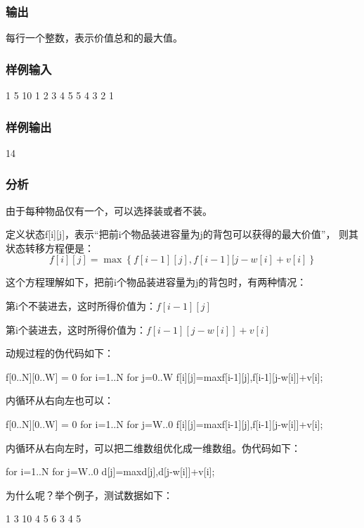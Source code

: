 \subsubsection{输出}
每行一个整数，表示价值总和的最大值。

\subsubsection{样例输入}
\begin{Code}
1
5 10
1 2 3 4 5
5 4 3 2 1
\end{Code}

\subsubsection{样例输出}
\begin{Code}
14
\end{Code}

\subsubsection{分析}
由于每种物品仅有一个，可以选择装或者不装。

定义状态f[i][j]，表示“把前i个物品装进容量为j的背包可以获得的最大价值”，
则其状态转移方程便是：
$$f[i][j]=\max\left\{f[i-1][j], f[i-1][j-w[i]+v[i]\right\}$$

这个方程理解如下，把前i个物品装进容量为j的背包时，有两种情况：
\begindot
\item 第i个不装进去，这时所得价值为：$f[i-1][j]$
\item 第i个装进去，这时所得价值为：$f[i-1][j-w[i]]+v[i]$
\myenddot

动规过程的伪代码如下：
\begin{Code}
f[0..N][0..W] = 0
for i=1..N
    for j=0..W
        f[i][j]=max{f[i-1][j],f[i-1][j-w[i]]+v[i]};
\end{Code}

内循环从右向左也可以：
\begin{Code}
f[0..N][0..W] = 0
for i=1..N
    for j=W..0
        f[i][j]=max{f[i-1][j],f[i-1][j-w[i]]+v[i]};
\end{Code}

内循环从右向左时，可以把二维数组优化成一维数组。伪代码如下：
\begin{Code}
for i=1..N
    for j=W..0
        d[j]=max{d[j],d[j-w[i]]+v[i]};
\end{Code}

为什么呢？举个例子，测试数据如下：
\begin{Code}
1
3 10
4 5 6
3 4 5
\end{Code}

